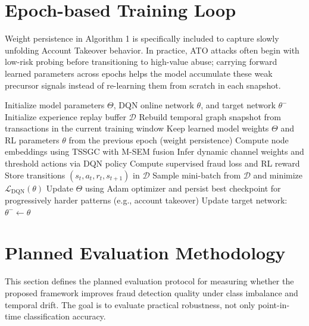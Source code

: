 \documentclass[12pt,a4paper]{report}
\begin{document}
\section{Epoch-based Training Loop}
Weight persistence in Algorithm 1 is specifically included to capture slowly unfolding Account Takeover behavior. In practice, ATO attacks often begin with low-risk probing before transitioning to high-value abuse; carrying forward learned parameters across epochs helps the model accumulate these weak precursor signals instead of re-learning them from scratch in each snapshot.
\begin{algorithm}[h!]
\caption{Epoch-based training with graph rebuilding and weight persistence}
\begin{algorithmic}[1]
\State Initialize model parameters $\Theta$, DQN online network $\theta$, and target network $\theta^-$
\State Initialize experience replay buffer $\mathcal{D}$
    \State Rebuild temporal graph snapshot from transactions in the current training window
    \State Keep learned model weights $\Theta$ and RL parameters $\theta$ from the previous epoch (weight persistence)
    \State Compute node embeddings using TSSGC with M-SEM fusion
    \State Infer dynamic channel weights and threshold actions via DQN policy
    \State Compute supervised fraud loss and RL reward
    \State Store transitions $(s_t,a_t,r_t,s_{t+1})$ in $\mathcal{D}$
    \State Sample mini-batch from $\mathcal{D}$ and minimize $\mathcal{L}_{\mathrm{DQN}}(\theta)$
    \State Update $\Theta$ using Adam optimizer and persist best checkpoint for progressively harder patterns (e.g., account takeover)
        \State Update target network: $\theta^- \gets \theta$
    \EndIf
\EndFor
\end{algorithmic}
\end{algorithm}

\section{Planned Evaluation Methodology}
This section defines the planned evaluation protocol for measuring whether the proposed framework improves fraud detection quality under class imbalance and temporal drift. The goal is to evaluate practical robustness, not only point-in-time classification accuracy.
\end{document}
